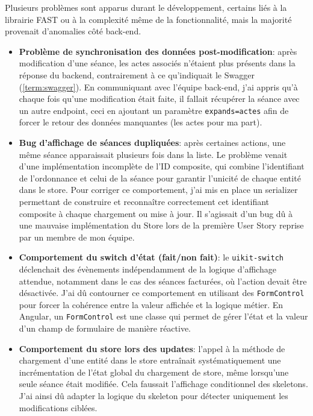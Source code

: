 \documentclass{article}
\begin{document}
Plusieurs problèmes sont apparus durant le développement, certains liés à la librairie FAST ou à la complexité même de la fonctionnalité, mais la majorité provenait d'anomalies côté back-end.

\begin{itemize}
    \item \textbf{Problème de synchronisation des données post-modification}: après modification d'une séance, les actes associés n'étaient plus présents dans la réponse du backend, contrairement à ce qu'indiquait le Swagger (\ref{term:swagger}).
    En communiquant avec l'équipe back-end, j'ai appris qu'à chaque fois qu'une modification était faite, il fallait récupérer la séance avec un autre endpoint, ceci en ajoutant un paramètre \texttt{expands=actes} afin de forcer le retour des données manquantes (les actes pour ma part).

    \item \textbf{Bug d'affichage de séances dupliquées}: après certaines actions, une même séance apparaissait plusieurs fois dans la liste. Le problème venait d'une implémentation incomplète de l'ID composite, qui combine l'identifiant de l'ordonnance et celui de la séance pour garantir l'unicité de chaque entité dans le store. Pour corriger ce comportement, j'ai mis en place un serializer permettant de construire et reconnaître correctement cet identifiant composite à chaque chargement ou mise à jour.
    Il s'agissait d'un bug dû à une mauvaise implémentation du Store lors de la première User Story reprise par un membre de mon équipe.

    \item \textbf{Comportement du switch d'état (fait/non fait)}: le \texttt{uikit-switch} déclenchait des évènements indépendamment de la logique d'affichage attendue, notamment dans le cas des séances facturées, où l'action devait être désactivée. J'ai dû contourner ce comportement en utilisant des \texttt{FormControl} pour forcer la cohérence entre la valeur affichée et la logique métier.
    En Angular, un \texttt{FormControl} est une classe qui permet de gérer l'état et la valeur d'un champ de formulaire de manière réactive.

    \item \textbf{Comportement du store lors des updates}: l'appel à la méthode de chargement d'une entité dans le store entraînait systématiquement une incrémentation de l'état global du chargement de store, même lorsqu'une seule séance était modifiée. Cela faussait l'affichage conditionnel des skeletons. J'ai ainsi dû adapter la logique du skeleton pour détecter uniquement les modifications ciblées.


\end{itemize}
\end{document}

